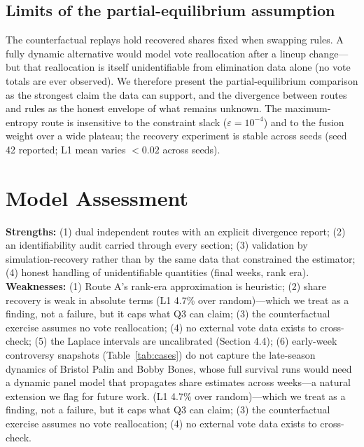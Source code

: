 \documentclass[12pt]{article}
\begin{document}
\subsection*{Limits of the partial-equilibrium assumption}
The counterfactual replays hold recovered shares fixed when swapping rules. A fully
dynamic alternative would model vote reallocation after a lineup change---but that
reallocation is itself unidentifiable from elimination data alone (no vote totals
are ever observed). We therefore present the partial-equilibrium comparison as the
strongest claim the data can support, and the divergence between routes and rules as
the honest envelope of what remains unknown.
The maximum-entropy route is insensitive to the constraint slack ($\varepsilon =
10^{-4}$) and to the fusion weight over a wide plateau; the recovery experiment is
stable across seeds (seed 42 reported; L1 mean varies $<0.02$ across seeds).

\section{Model Assessment}
\textbf{Strengths:} (1) dual independent routes with an explicit divergence report;
(2) an identifiability audit carried through every section; (3) validation by
simulation-recovery rather than by the same data that constrained the estimator;
(4) honest handling of unidentifiable quantities (final weeks, rank era).
\textbf{Weaknesses:} (1) Route A's rank-era approximation is heuristic; (2) share
recovery is weak in absolute terms (L1 4.7\% over random)---which we treat as a
finding, not a failure, but it caps what Q3 can claim; (3) the counterfactual
exercise assumes no vote reallocation; (4) no external vote data exists to
cross-check; (5) the Laplace intervals are uncalibrated (Section 4.4); (6) early-week
controversy snapshots (Table~\ref{tab:cases}) do not capture the late-season dynamics
of Bristol Palin and Bobby Bones, whose full survival runs would need a dynamic
panel model that propagates share estimates across weeks---a natural extension we
flag for future work. (L1 4.7\% over random)---which we treat as a
finding, not a failure, but it caps what Q3 can claim; (3) the counterfactual
exercise assumes no vote reallocation; (4) no external vote data exists to
cross-check.

\end{document}
